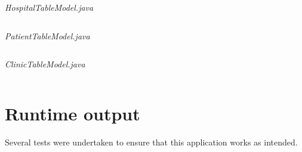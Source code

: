 \documentclass{article}
\begin{document}
\textit{HospitalTableModel.java}
\inputminted{java}{./src/main/java/com/yvesstraten/medicalconsolegui/models/HospitalTableModel.java}

\textit{PatientTableModel.java}
\inputminted{java}{./src/main/java/com/yvesstraten/medicalconsolegui/models/PatientTableModel.java}

\textit{ClinicTableModel.java}
\inputminted{java}{./src/main/java/com/yvesstraten/medicalconsolegui/models/ClinicTableModel.java}

\section{Runtime output}\label{sec:runtime_output} %
Several tests were undertaken to ensure that this application works as intended.

\end{document}

